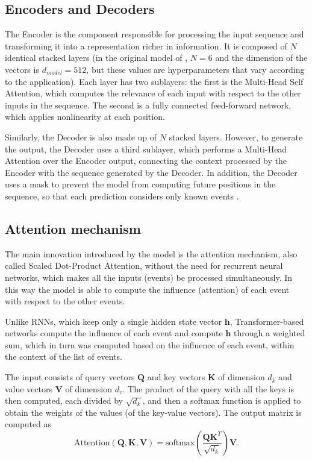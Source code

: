 \subsection{Encoders and Decoders}\label{subsec:encoders-decoders}

    The Encoder is the component responsible for processing the input sequence and transforming it into a representation richer in information. It is composed of $N$ identical stacked layers (in the original model of , $N = 6$ and the dimension of the vectors is $d_{model} = 512$, but these values are hyperparameters that vary according to the application). Each layer has two sublayers: the first is the Multi-Head Self Attention, which computes the relevance of each input with respect to the other inputs in the sequence. The second is a fully connected feed-forward network, which applies nonlinearity at each position.

    Similarly, the Decoder is also made up of $N$ stacked layers. However, to generate the output, the Decoder uses a third sublayer, which performs a Multi-Head Attention over the Encoder output, connecting the context processed by the Encoder with the sequence generated by the Decoder. In addition, the Decoder uses a mask to prevent the model from computing future positions in the sequence, so that each prediction considers only known events \cite{vaswani_attention_2017}.

\subsection{Attention mechanism}\label{subsec:mecanismo-de-atencao}

    The main innovation introduced by the model is the attention mechanism, also called Scaled Dot-Product Attention, without the need for recurrent neural networks, which makes all the inputs (events) be processed simultaneously. In this way the model is able to compute the influence (attention) of each event with respect to the other events.

    Unlike RNNs, which keep only a single hidden state vector $\mathbf{h}$, Transformer-based networks compute the influence of each event and compute $\mathbf{h}$ through a weighted sum, which in turn was computed based on the influence of each event, within the context of the list of events.

    The input consists of query vectors $\mathbf{Q}$ and key vectors $\mathbf{K}$ of dimension $d_k$ and value vectors $\mathbf{V}$ of dimension $d_v$. The product of the query with all the keys is then computed, each divided by $\sqrt{d_k}$, and then a softmax function is applied to obtain the weights of the values (of the key-value vectors). The output matrix is computed as
    \begin{equation}
        \text{Attention}(\mathbf{Q},\mathbf{K},\mathbf{V}) = \text{softmax}(\frac{\mathbf{Q}\mathbf{K}^T}{\sqrt{d_k}})\mathbf{V}
        \label{eq:attention}.
    \end{equation}

